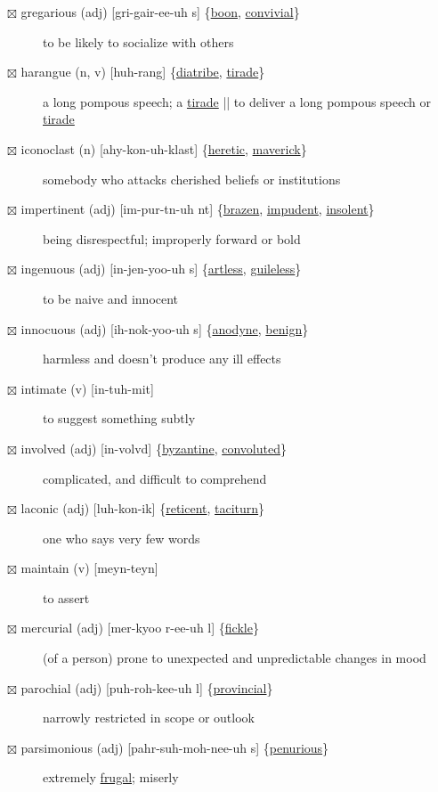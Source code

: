\documentclass[11pt]{article}
\begin{document}
\begin{description}
\item[{$\boxtimes$ \label{orgdebaeb2}gregarious (adj) [gri-gair-ee-uh s] \{\hyperref[org2311542]{boon}, \hyperref[org12e2a2b]{convivial}\}}] to be likely to socialize with others
\item[{$\boxtimes$ \label{org045aced}harangue (n, v) [huh-rang] \{\hyperref[orgdfe7602]{diatribe}, \hyperref[org6667745]{tirade}\}}] a long pompous speech; a \hyperref[org6667745]{tirade} || to deliver a long pompous speech or \hyperref[org6667745]{tirade}
\item[{$\boxtimes$ \label{org55ebaaa}iconoclast (n) [ahy-kon-uh-klast] \{\hyperref[orgfb725fd]{heretic}, \hyperref[org15e752e]{maverick}\}}] somebody who attacks cherished beliefs or institutions
\item[{$\boxtimes$ \label{org66b257e}impertinent (adj) [im-pur-tn-uh nt] \{\hyperref[orga7c2142]{brazen}, \hyperref[orgdac3101]{impudent}, \hyperref[org7d4233d]{insolent}\}}] being disrespectful; improperly forward or bold
\item[{$\boxtimes$ \label{org3f15685}ingenuous (adj) [in-jen-yoo-uh s] \{\hyperref[orgc958c7d]{artless}, \hyperref[orgc2431f3]{guileless}\}}] to be naive and innocent
\item[{$\boxtimes$ \label{org773281e}innocuous (adj) [ih-nok-yoo-uh s] \{\hyperref[orgf23f0a8]{anodyne}, \hyperref[org0405622]{benign}\}}] harmless and doesn't produce any ill effects
\item[{$\boxtimes$ intimate (v) [in-tuh-mit]}] to suggest something subtly
\item[{$\boxtimes$ \label{org59ec861}involved (adj) [in-volvd] \{\hyperref[org15ac659]{byzantine}, \hyperref[org2ba5d5b]{convoluted}\}}] complicated, and difficult to comprehend
\item[{$\boxtimes$ \label{orgb49cb86}laconic (adj) [luh-kon-ik] \{\hyperref[orgb962b96]{reticent}, \hyperref[orgbeffa4e]{taciturn}\}}] one who says very few words
\item[{$\boxtimes$ maintain (v) [meyn-teyn]}] to assert
\item[{$\boxtimes$ \label{org76ea20d}mercurial (adj) [mer-kyoo r-ee-uh l] \{\hyperref[org93e669e]{fickle}\}}] (of a person) prone to unexpected and unpredictable changes in mood
\item[{$\boxtimes$ \label{org3c9f40a}parochial (adj) [puh-roh-kee-uh l] \{\hyperref[org4804e7c]{provincial}\}}] narrowly restricted in scope or outlook
\item[{$\boxtimes$ \label{org6ab672d}parsimonious (adj) [pahr-suh-moh-nee-uh s] \{\hyperref[orgb268dd4]{penurious}\}}] extremely \hyperref[org0d99c47]{frugal}; miserly

\end{description}
\end{document}
